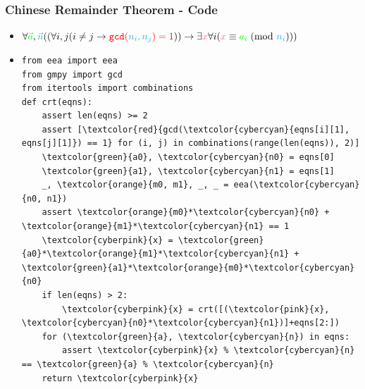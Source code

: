 \documentclass[aspectratio=169]{beamer}
\begin{document}
\begin{frame}[fragile]
\frametitle{Chinese Remainder Theorem - Code}
\begin{itemize}
\item $\forall {\color{green}\vec{a}}, {\color{cybercyan}\vec{n}}((\forall i,j(i \neq j \rightarrow {\color{red}\verb|gcd|({\color{cybercyan}n_i, n_j}) = 1})) \rightarrow \exists {\color{cyberpink}x} \forall i({\color{cyberpink}x} \equiv {\color{green}a_i}\hspace{1mm}(\text{mod }{\color{cybercyan}n_i})))$
\item
\begin{Verbatim}[fontsize=\scriptsize,commandchars=\\\{\}]
from eea import eea
from gmpy import gcd
from itertools import combinations
def crt(eqns):
    assert len(eqns) >= 2
    assert [\textcolor{red}{gcd(\textcolor{cybercyan}{eqns[i][1], eqns[j][1]}) == 1} for (i, j) in combinations(range(len(eqns)), 2)]
    \textcolor{green}{a0}, \textcolor{cybercyan}{n0} = eqns[0]
    \textcolor{green}{a1}, \textcolor{cybercyan}{n1} = eqns[1]
    _, \textcolor{orange}{m0, m1}, _, _ = eea(\textcolor{cybercyan}{n0, n1})
    assert \textcolor{orange}{m0}*\textcolor{cybercyan}{n0} + \textcolor{orange}{m1}*\textcolor{cybercyan}{n1} == 1
    \textcolor{cyberpink}{x} = \textcolor{green}{a0}*\textcolor{orange}{m1}*\textcolor{cybercyan}{n1} + \textcolor{green}{a1}*\textcolor{orange}{m0}*\textcolor{cybercyan}{n0}
    if len(eqns) > 2:
        \textcolor{cyberpink}{x} = crt([(\textcolor{pink}{x}, \textcolor{cybercyan}{n0}*\textcolor{cybercyan}{n1})]+eqns[2:])
    for (\textcolor{green}{a}, \textcolor{cybercyan}{n}) in eqns:
        assert \textcolor{cyberpink}{x} % \textcolor{cybercyan}{n} == \textcolor{green}{a} % \textcolor{cybercyan}{n}
    return \textcolor{cyberpink}{x}
\end{Verbatim}
\end{itemize}
\end{frame}
\end{document}
